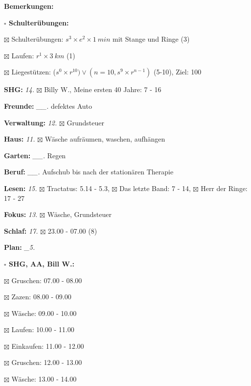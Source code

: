 \documentclass[10pt,a4paper]{article}
\newcommand\prop[1] {{\color {alizarin} {\bf #1}}}        %
\newcommand\mand[1] {{\color {burntorange} {\bf #1}}}     %
\newcommand\topspace{\vskip -15pt \hskip 20pt}
\newcommand\bottomspace{\vskip 4pt}
\newcommand\n[1] { {\sl #1.} \hskip 5pt }
\begin{document}
\begin{mdframed}[style=daystyle]
\begin{labeling}{{\mand {Bemerkungen:}}}
\begin{minipage}{0.75\textwidth}
\begin{labeling}{\prop {$\square$ {Schulterübungen:}}}
      \item[$\boxtimes$ Schulterübungen:] $s^3 \times e^2 \times 1\ min$ mit Stange und Ringe (3)
      \item[$\boxtimes$ Laufen:]          $r^1 \times 3\ km$ (1)
      \item[$\boxtimes$ Liegestützen:]    ($s^0 \times r^{10}) \vee (n=10, s^9 \times r^{n-1})$ (5-10), Ziel: 100
      \end{labeling}
    \end{minipage}
    \bottomspace        
  \item[{\mand {SHG:}}]            \n{14} $\boxtimes$ Billy W., Meine ersten 40 Jahre: 7 - 16
  \item[{\mand {Freunde:}}]      \n{\_\_} defektes Auto
  \item[{\mand {Verwaltung:}}]     \n{12} $\boxtimes$ Grundsteuer
  \item[{\mand {Haus:}}]           \n{11} $\boxtimes$ Wäsche aufräumen, waschen, aufhängen
  \item[{\mand {Garten:}}]       \n{\_\_} Regen
  \item[{\mand {Beruf:}}]        \n{\_\_} Aufschub bis nach der stationären Therapie
  \item[{\mand {Lesen:}}]          \n{15} $\boxtimes$ Tractatus: 5.14 - 5.3,
      $\boxtimes$ Das letzte Band: 7 - 14, $\boxtimes$ Herr der Ringe: 17 - 27
  \item[{\mand {Fokus:}}]          \n{13} $\boxtimes$ Wäsche, Grundsteuer
  \item[{\mand {Schlaf:}}]         \n{17} $\boxtimes$ 23.00 - 07.00 (8)
  \item[{\mand {Plan:}}]          \n{\_5}
    \topspace
    \begin{minipage}{0.75\textwidth}  
      \begin{labeling}{\prop {$\square$ {SHG, AA, Bill W.:}}} 
        \setlength\itemsep{-3pt}
      \item[$\boxtimes$ Gruschen:]         07.00 - 08.00
      \item[$\boxtimes$ Zazen:]            08.00 - 09.00
      \item[$\boxtimes$ Wäsche:]           09.00 - 10.00
      \item[$\boxtimes$ Laufen:]           10.00 - 11.00
      \item[$\boxtimes$ Einkaufen:]        11.00 - 12.00
      \item[$\boxtimes$ Gruschen:]         12.00 - 13.00
      \item[$\boxtimes$ Wäsche:]           13.00 - 14.00

\end{labeling}
\end{minipage}
\end{labeling}
\end{mdframed}
\end{document}
